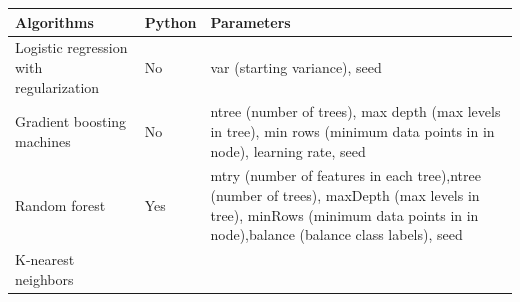 \documentclass[]{article}
\begin{document}
\begin{longtable}[]{@{}lll@{}}
\toprule
\begin{minipage}[b]{0.35\columnwidth}\raggedright\strut
Algorithms\strut
\end{minipage} & \begin{minipage}[b]{0.08\columnwidth}\raggedright\strut
Python\strut
\end{minipage} & \begin{minipage}[b]{0.48\columnwidth}\raggedright\strut
Parameters\strut
\end{minipage}\tabularnewline
\midrule
\endhead
\begin{minipage}[t]{0.35\columnwidth}\raggedright\strut
Logistic regression with regularization\strut
\end{minipage} & \begin{minipage}[t]{0.08\columnwidth}\raggedright\strut
No\strut
\end{minipage} & \begin{minipage}[t]{0.48\columnwidth}\raggedright\strut
var (starting variance), seed\strut
\end{minipage}\tabularnewline
\begin{minipage}[t]{0.35\columnwidth}\raggedright\strut
Gradient boosting machines\strut
\end{minipage} & \begin{minipage}[t]{0.08\columnwidth}\raggedright\strut
No\strut
\end{minipage} & \begin{minipage}[t]{0.48\columnwidth}\raggedright\strut
ntree (number of trees), max depth (max levels in tree), min rows
(minimum data points in in node), learning rate, seed\strut
\end{minipage}\tabularnewline
\begin{minipage}[t]{0.35\columnwidth}\raggedright\strut
Random forest\strut
\end{minipage} & \begin{minipage}[t]{0.08\columnwidth}\raggedright\strut
Yes\strut
\end{minipage} & \begin{minipage}[t]{0.48\columnwidth}\raggedright\strut
mtry (number of features in each tree),ntree (number of trees), maxDepth
(max levels in tree), minRows (minimum data points in in node),balance
(balance class labels), seed\strut
\end{minipage}\tabularnewline
\begin{minipage}[t]{0.35\columnwidth}\raggedright\strut
K-nearest neighbors\strut

\end{minipage}
\end{longtable}
\end{document}
